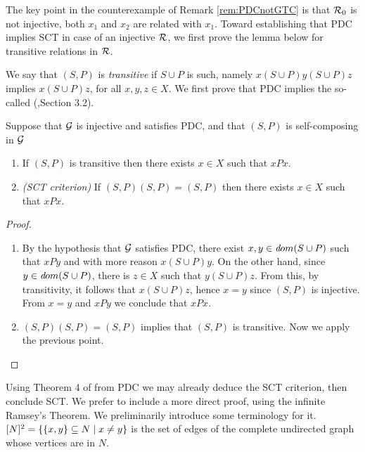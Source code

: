 The key point in the counterexample of Remark \ref{rem:PDCnotGTC} is that $\mathcal{R}_0$ is not injective, both $x_1$ and $x_2$ are related with $x_1$. 
Toward establishing that PDC implies SCT
in case of an injective $\mathcal{R}$, we first prove the lemma below for transitive relations in 
$\mathcal{R}$. 

We say that $(S,P)$ is {\em transitive} if $S \cup P$ is such, namely $x(S \cup P)y(S \cup P)z$ implies $x(S \cup P) z$, for all $x, y, z \in X$. We first prove that PDC implies the so-called
 (\cite{Lee1},Section 3.2).

\begin{lemma}
\label{lem:transitivity}
Suppose that $\mathcal{G}$ is injective and satisfies PDC, and that 
$(S,P)$ is self-composing in $\mathcal{G}$ 
\begin{enumerate}
\item
\label{lem:transitivity-01}
If $(S,P)$ is transitive then there exists $x \in X$ such that $xPx$.

\item
\label{lem:transitivity-02}
\emph{(SCT criterion)} If $(S,P)(S,P)=(S,P)$ then there exists $x \in X$ such that $xPx$.
\end{enumerate}
\end{lemma}

\begin{proof}
\begin{enumerate}
\item
By the hypothesis that $\mathcal{G}$ satisfies PDC, there exist $x,y \in {\textit dom}( S \cup P )$ such that $xPy$ and with more reason $x(S \cup P)y$. On the other hand, since $y \in {\textit dom}( S \cup P )$, there is $z \in X$ such that $y(S \cup P)z$. From this, by transitivity, it follows that
$x(S \cup P)z$, hence $x = y$ since $(S,P)$ is injective. From $x=y$ and $xPy$ we conclude
that $xPx$.
\item
$(S,P)(S,P)=(S,P)$ implies that $(S,P)$ is transitive. Now we apply the previous point.
\end{enumerate}
\end{proof}

Using Theorem 4 of \cite{Lee1} from PDC we may already deduce the SCT criterion,
then conclude SCT. We prefer to include a 
more direct proof, %
using the infinite Ramsey's Theorem. We preliminarily introduce some terminology for it.
$[N]^2 = \{ \{ x,y \} \subseteq N \mid x \neq y \}$ is the set of edges of the complete undirected graph whose vertices are in $N$. 

